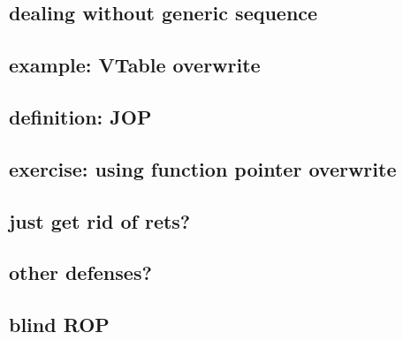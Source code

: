\subsection{dealing without generic sequence}


\subsection{example: VTable overwrite}



\subsection{definition: JOP}



\subsection{exercise: using function pointer overwrite}


\subsection{just get rid of rets?}


\subsection{other defenses?}


\subsection{blind ROP}

